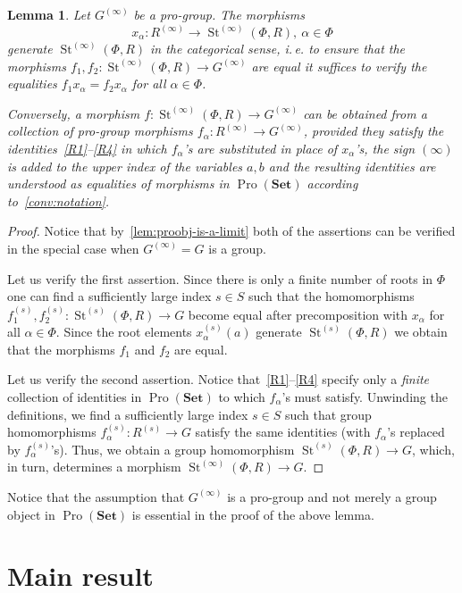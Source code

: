 \documentclass{article}
\newtheorem{lemma}{Lemma} \numberwithin{lemma}{section}
\theoremstyle{definition}
\theoremstyle{remark}
\DeclareMathOperator\St{St}
\DeclareMathOperator{\Pro}{Pro}
\newcommand{\Set}{\mathbf{Set}}
\begin{document}
\begin{lemma}\label{SteinbergPresentation}
Let \(G^{(\infty)}\) be a pro-group. The morphisms \[x_{\alpha} \colon R^{(\infty)} \to \St^{(\infty)}(\Phi, R), \ \alpha\in \Phi\] generate $\St^{(\infty)}(\Phi, R)$ in the categorical sense, i.\,e. to ensure that the morphisms $f_1,f_2\colon\St^{(\infty)}(\Phi, R) \to G^{(\infty)}$ are equal it suffices to verify the equalities $f_1 x_{\alpha} = f_2 x_\alpha$ for all $\alpha\in\Phi$.

Conversely, a morphism $f \colon \St^{(\infty)}(\Phi, R) \to G^{(\infty)}$ can be obtained from a collection of pro-group morphisms \(f_{\alpha} \colon R^{(\infty)} \to G^{(\infty)}\), provided they satisfy the identities~\eqref{R1}--\eqref{R4} in which $f_{\alpha}$'s are substituted in place of $x_\alpha$'s, the sign $(\infty)$ is added to the upper index of the variables $a, b$ and the resulting identities are understood as equalities of morphisms in \(\Pro(\Set)\) according to~\cref{conv:notation}.
\end{lemma}
\begin{proof}
Notice that by~\cref{lem:proobj-is-a-limit} both of the assertions can be verified in the special case when $G^{(\infty)} = G$ is a group.

Let us verify the first assertion. Since there is only a finite number of roots in $\Phi$ one can find a sufficiently large index $s \in S$ such that the homomorphisms $f_1^{(s)}, f_2^{(s)}\colon \St^{(s)}(\Phi, R) \to G$ become equal after precomposition with $x_\alpha$ for all $\alpha \in \Phi$.
Since the root elements $x_\alpha^{(s)}(a)$ generate $\St^{(s)}(\Phi, R)$ we obtain that the morphisms $f_1$ and $f_2$ are equal.

Let us verify the second assertion. 
Notice that~\eqref{R1}--\eqref{R4} specify only a {\it finite} collection of identities in $\Pro(\Set)$ to which $f_\alpha$'s must satisfy.
Unwinding the definitions, we find a sufficiently large index $s \in S$ such that group homomorphisms 
 $f_\alpha^{(s)}\colon R^{(s)} \to G$ satisfy the same identities (with $f_\alpha$'s replaced by $f_\alpha^{(s)}$'s).
Thus, we obtain a group homomorphism $\St^{(s)}(\Phi, R) \to G$, which, in turn, determines a morphism $\St^{(\infty)}(\Phi, R) \to G$.
\end{proof}
Notice that the assumption that $G^{(\infty)}$ is a pro-group and not merely a group object in $\Pro(\Set)$ is essential in the proof of the above lemma.

\section{Main result}
\end{document}
